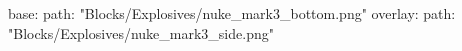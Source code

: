 base:
  path: "Blocks/Explosives/nuke_mark3_bottom.png"
overlay:
  path: "Blocks/Explosives/nuke_mark3_side.png"